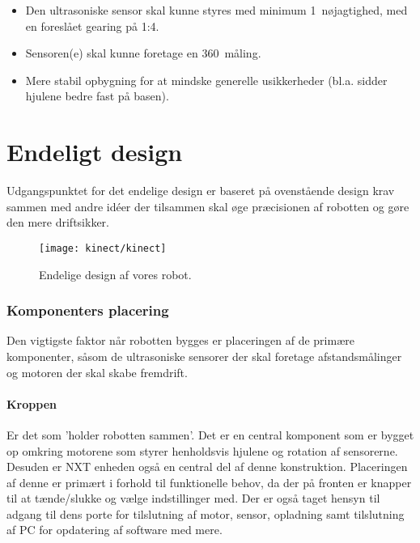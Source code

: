 \begin{itemize}
\item Den ultrasoniske sensor skal kunne styres med  minimum 1\degree~nøjagtighed, med en foreslået gearing på 1:4.
\item Sensoren(e) skal kunne foretage en 360\degree~måling.
\item Mere stabil opbygning for at mindske generelle usikkerheder (bl.a. sidder hjulene bedre fast på basen).
\end{itemize} 


\section{Endeligt design}
Udgangspunktet for det endelige design er baseret på ovenstående design krav sammen med andre idéer der tilsammen skal øge præcisionen af robotten og gøre den mere driftsikker.

\begin{figure}
\centering
\texttt{[image: kinect/kinect]}
\caption{Endelige design af vores robot.}
\label{robot:opbygning}
\end{figure}

\subsubsection{Komponenters placering}

Den vigtigste faktor når robotten bygges er placeringen af de primære komponenter, såsom de ultrasoniske sensorer der skal foretage afstandsmålinger og motoren der skal skabe fremdrift.

\paragraph{Kroppen}
Er det som 'holder robotten sammen'.
Det er en central komponent som er bygget op omkring motorene som styrer henholdsvis hjulene og rotation af sensorerne.
Desuden er NXT enheden også en central del af denne konstruktion.
Placeringen af denne er primært i forhold til funktionelle behov, da der på fronten er knapper til at tænde/slukke og vælge indstillinger med.
Der er også taget hensyn til adgang til dens porte for tilslutning af motor, sensor, opladning samt tilslutning af PC for opdatering af software med mere.

